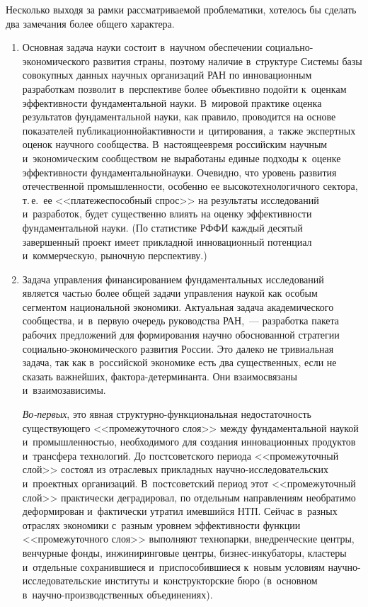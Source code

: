 \begin{multicols}{2}
    Несколько выходя за рамки рассматриваемой проблематики, хотелось бы 
сделать два замечания более общего характера.
    \begin{enumerate}[1.]
    \item  Основная задача науки состоит в~научном обеспечении  
со\-ци\-аль\-но-эко\-но\-ми\-че\-ско\-го развития страны, поэтому наличие 
в~структуре Системы базы совокупных данных научных организаций РАН по 
инновационным разработкам позволит в~перспективе более объективно 
подойти к~оценкам эффективности фундаментальной науки. В~мировой 
практике оценка результатов фундаментальной науки, как правило, проводится 
на основе показателей публикационной\linebreak активности и~цитирования, а~также 
экспертных оценок научного сообщества. В~настоящее\linebreak время российским 
научным и~экономическим сообществом не выработаны единые подходы\linebreak 
к~оценке эффективности фундаментальной\linebreak науки. Очевидно, что уровень 
развития отече\-ственной промышленности, особенно ее %
 высокотехнологичного 
сектора, т.\,е.\ ее <<платеже\-способный спрос>> на результаты исследований\linebreak 
и~разработок, будет существенно влиять на оценку эффективности 
фундаментальной науки. (По статистике РФФИ каждый десятый завершенный 
проект имеет прикладной инновационный потенциал и~коммерческую, 
рыночную перспективу.) 
    \item  Задача управления финансированием фундаментальных 
исследований является частью более общей задачи управления наукой как 
особым сегментом национальной экономики. Актуаль\-ная задача 
академического сообщества, и~в~первую очередь руководства РАН,~---
разработка пакета рабочих предложений для формирования научно 
обоснованной стратегии со\-ци\-аль\-но-эко\-но\-ми\-че\-ско\-го развития 
России. Это далеко не тривиальная задача, так как в~российской экономике есть 
два существенных, если не сказать важнейших, фак\-то\-ра-де\-тер\-ми\-нан\-та. 
Они взаимосвязаны и~взаимозависимы. 
    
    \textit{Во-первых}, это явная струк\-тур\-но-функ\-цио\-наль\-ная 
недостаточность существующего <<промежуточного слоя>> между 
фундаментальной наукой и~промышленностью, необходимого для создания 
инновационных продуктов и~трансфера технологий. До постсоветского периода 
<<промежуточный слой>> состоял из отраслевых прикладных на\-уч\-но-ис\-сле\-до\-ва\-тель\-ских 
и~проектных организаций. В~постсоветский период этот <<промежуточный 
слой>> практически деградировал, по отдельным направлениям необратимо 
деформирован и~фактически утратил имевшийся 
НТП. Сейчас в~разных отраслях экономики с~разным уровнем 
эффективности функции <<промежуточного слоя>> выполняют технопарки, 
внедренческие центры, венчурные фонды, инжиниринговые центры,  
биз\-нес-ин\-ку\-ба\-то\-ры, кластеры и~отдельные сохранившиеся 
и~приспособившиеся к~новым условиям на\-уч\-но-ис\-сле\-до\-ва\-тель\-ские институты
и~конструкторские бюро (в~основном 
    в~на\-уч\-но-про\-из\-вод\-ст\-вен\-ных объединениях).
    

\end{enumerate}
\end{multicols}
